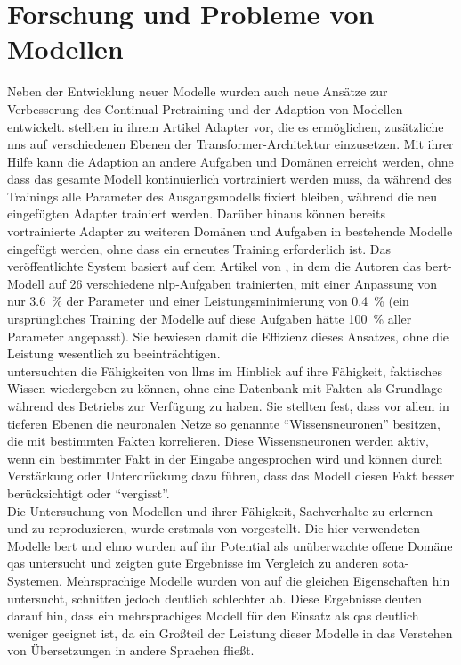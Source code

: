 \section{Forschung und Probleme von Modellen}
Neben der Entwicklung neuer Modelle wurden auch neue Ansätze zur Verbesserung des Continual Pretraining und der Adaption von Modellen entwickelt. 
\citet{adapterhub} stellten in ihrem Artikel Adapter vor, die es ermöglichen, zusätzliche \ac{nn}s auf verschiedenen Ebenen der Transformer-Architektur einzusetzen.
Mit ihrer Hilfe kann die Adaption an andere Aufgaben und Domänen erreicht werden, ohne dass das gesamte Modell kontinuierlich vortrainiert werden muss, da während des Trainings alle Parameter des Ausgangsmodells fixiert bleiben, während die neu eingefügten Adapter trainiert werden.
Darüber hinaus können bereits vortrainierte Adapter zu weiteren Domänen und Aufgaben in bestehende Modelle eingefügt werden, ohne dass ein erneutes Training erforderlich ist.
Das veröffentlichte System basiert auf dem Artikel von \citet{adapter_build_on}, in dem die Autoren das \ac{bert}-Modell auf 26 verschiedene \ac{nlp}-Aufgaben trainierten, mit einer Anpassung von nur \SI{3,6}{\percent} der Parameter und einer Leistungsminimierung von \SI{0,4}{\percent} (ein ursprüngliches Training der Modelle auf diese Aufgaben hätte \SI{100}{\percent} aller Parameter angepasst). Sie bewiesen damit die Effizienz dieses Ansatzes, ohne die Leistung wesentlich zu beeinträchtigen.\\

\citet{knowledge_neurons} untersuchten die Fähigkeiten von \ac{llm}s im Hinblick auf ihre Fähigkeit, faktisches Wissen wiedergeben zu können, ohne eine Datenbank mit Fakten als Grundlage während des Betriebs zur Verfügung zu haben.
Sie stellten fest, dass vor allem in tieferen Ebenen die neuronalen Netze so genannte \enquote{Wissensneuronen} besitzen, die mit bestimmten Fakten korrelieren.
Diese Wissensneuronen werden aktiv, wenn ein bestimmter Fakt in der Eingabe angesprochen wird und können durch Verstärkung oder Unterdrückung dazu führen, dass das Modell diesen Fakt besser berücksichtigt oder \enquote{vergisst}.\\

Die Untersuchung von Modellen und ihrer Fähigkeit, Sachverhalte zu erlernen und zu reproduzieren, wurde erstmals von \citet{knowledge_base} vorgestellt.
Die hier verwendeten Modelle \ac{bert} und \ac{elmo} wurden auf ihr Potential als unüberwachte offene Domäne \ac{qas} untersucht und zeigten gute Ergebnisse im Vergleich zu anderen \ac{sota}-Systemen.
Mehrsprachige Modelle wurden von \citet{xfactr} auf die gleichen Eigenschaften hin untersucht, schnitten jedoch deutlich schlechter ab. Diese Ergebnisse deuten darauf hin, dass ein mehrsprachiges Modell für den Einsatz als \ac{qas} deutlich weniger geeignet ist, da ein Großteil der Leistung dieser Modelle in das Verstehen von Übersetzungen in andere Sprachen fließt.\\

